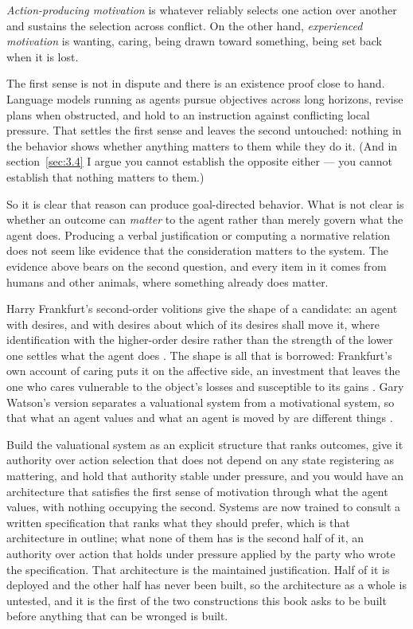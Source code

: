\textit{Action-producing motivation} is whatever reliably selects one action over another and sustains the selection across conflict. On the other hand, \textit{experienced motivation} is wanting, caring, being drawn toward something, being set back when it is lost.

The first sense is not in dispute and there is an existence proof close to hand. Language models running as agents pursue objectives across long horizons, revise plans when obstructed, and hold to an instruction against conflicting local pressure. That settles the first sense and leaves the second untouched: nothing in the behavior shows whether anything matters to them while they do it. (And in section~\ref{sec:3.4} I argue you cannot establish the opposite either — you cannot establish that nothing matters to them.)

So it is clear that reason can produce goal-directed behavior. What is not clear is whether an outcome can \emph{matter} to the agent rather than merely govern what the agent does. Producing a verbal justification or computing a normative relation does not seem like evidence that the consideration matters to the system. The evidence above bears on the second question, and every item in it comes from humans and other animals, where something already does matter.

Harry Frankfurt's second-order volitions give the shape of a candidate: an agent with desires, and with desires about which of its desires shall move it, where identification with the higher-order desire rather than the strength of the lower one settles what the agent does \autocite{frankfurt1971freedom}. The shape is all that is borrowed: Frankfurt's own account of caring puts it on the affective side, an investment that leaves the one who cares vulnerable to the object's losses and susceptible to its gains \autocite{frankfurt1982importance}. Gary Watson's version separates a valuational system from a motivational system, so that what an agent values and what an agent is moved by are different things \autocite{watson1975free}.

Build the valuational system as an explicit structure that ranks outcomes, give it authority over action selection that does not depend on any state registering as mattering, and hold that authority stable under pressure, and you would have an architecture that satisfies the first sense of motivation through what the agent values, with nothing occupying the second. Systems are now trained to consult a written specification that ranks what they should prefer, which is that architecture in outline; what none of them has is the second half of it, an authority over action that holds under pressure applied by the party who wrote the specification. That architecture is the maintained justification. Half of it is deployed and the other half has never been built, so the architecture as a whole is untested, and it is the first of the two constructions this book asks to be built before anything that can be wronged is built.

